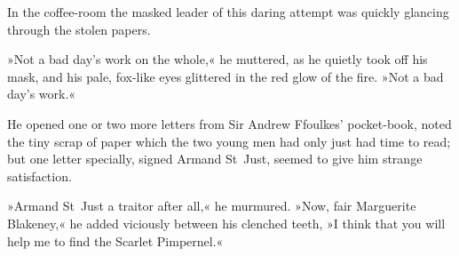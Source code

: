 In the coffee-room the masked leader of this daring attempt was quickly glancing through the stolen papers.

»Not a bad day's work on the whole,« he muttered, as he quietly took off his mask, and his pale, fox-like eyes glittered in the red glow of the fire. »Not a bad day's work.«

He opened one or two more letters from Sir Andrew Ffoulkes' pocket-book, noted the tiny scrap of paper which the two young men had only just had time to read; but one letter specially, signed Armand St~Just, seemed to give him strange satisfaction.

»Armand St~Just a traitor after all,« he murmured. »Now, fair Marguerite Blakeney,« he added viciously between his clenched teeth, »I think that you will help me to find the Scarlet Pimpernel.«